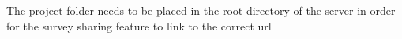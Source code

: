 The project folder needs to be placed in the root directory of the server in order for the survey sharing feature to link to the correct url 